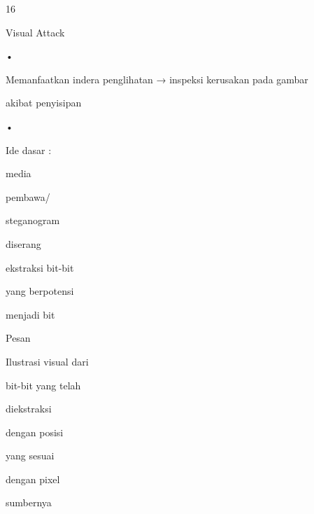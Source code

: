 \documentclass{article}
\begin{document}

16

Visual Attack

•

Memanfaatkan indera penglihatan → inspeksi kerusakan pada gambar 

akibat penyisipan

•

Ide dasar :

media 

pembawa/ 

steganogram 

diserang

ekstraksi bit-bit  

yang berpotensi 

menjadi bit 

Pesan

Ilustrasi visual dari 

bit-bit yang telah 

diekstraksi 

dengan posisi 

yang sesuai 

dengan pixel 

sumbernya
\end{document}
